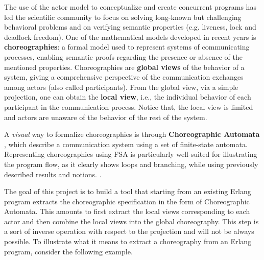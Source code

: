 The use of the actor model to conceptualize and create concurrent programs has led the scientific community to focus on solving long-known but challenging behavioral problems and on verifying semantic properties (e.g. liveness, lock and deadlock freedom). One of the mathematical models developed in recent years is \textbf{choreographies}: a formal model used to represent systems of communicating processes, enabling semantic proofs regarding the presence or absence of the mentioned properties. Choreographies are \textbf{global views} of the behavior of a system, giving a comprehensive perspective of the communication exchanges among actors (also called participants). From the global view, via a simple projection, one can obtain the \textbf{local view}, i.e., the individual behavior of each participant in the communication process. 
Notice that, the local view is limited and actors are unaware of the behavior of the rest of the system.

\bigskip

A \textit{visual} way to formalize choreographies is through \textbf{Choreographic Automata} \cite{coordination2020-chorAuto}, which describe a communication system using a set of finite-state automata. Representing choreographies using FSA is particularly well-suited for illustrating the program flow, as it clearly shows loops and branching, while using previously described results and notions. \cite{orlando2021corinne}. 

\bigskip
The goal of this project is to build a tool that starting from an existing Erlang program extracts the choreographic specification in the form of Choreographic Automata. This  amounts to first extract the local views corresponding to each actor and then  combine the local views into the global choreography. This step  is a sort of inverse operation with respect to the projection and will not be always possible. To illustrate what it means to extract a choreography from an Erlang program, consider the following example.

